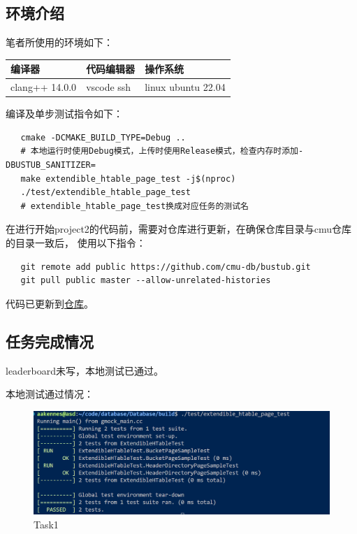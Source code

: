 \documentclass[a4paper]{article}
\begin{document}
\subsection{环境介绍}

笔者所使用的环境如下：

\begin{table}[h!]
   \begin{tabular}{|l|l|l|}
   \hline
   编译器            & 代码编辑器      & 操作系统               \\  \hline
   clang++ 14.0.0 & vscode ssh & linux ubuntu 22.04 \\  \hline
   \end{tabular}
\end{table}

编译及单步测试指令如下：

\begin{verbatim}
   cmake -DCMAKE_BUILD_TYPE=Debug ..
   # 本地运行时使用Debug模式，上传时使用Release模式，检查内存时添加-DBUSTUB_SANITIZER=
   make extendible_htable_page_test -j$(nproc)
   ./test/extendible_htable_page_test
   # extendible_htable_page_test换成对应任务的测试名
\end{verbatim}

在进行开始project2的代码前，需要对仓库进行更新，在确保仓库目录与cmu仓库的目录一致后，
使用以下指令：

\begin{verbatim}
   git remote add public https://github.com/cmu-db/bustub.git
   git pull public master --allow-unrelated-histories
\end{verbatim}

代码已更新到\href{https://github.com/aakennes/Database}{仓库}。

\subsection{任务完成情况}

leaderboard未写，本地测试已通过。

本地测试通过情况：

\begin{figure}[h!]
   \centering
   \includegraphics[scale=0.2]{19.png}
   \caption{Task1}
   \label{fig:1}
\end{figure}
\end{document}
